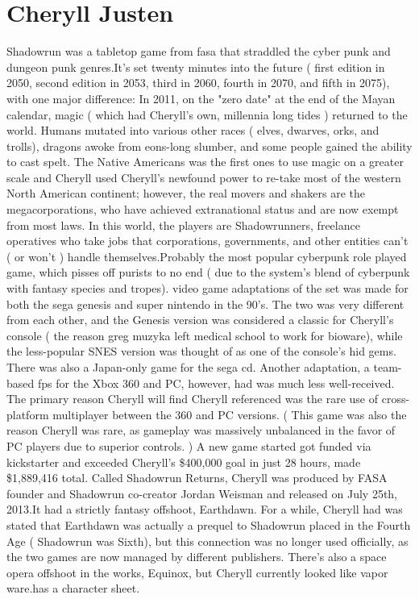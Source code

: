\documentclass[12pt]{book}
\begin{document}
\chapter{Cheryll Justen}

Shadowrun was a tabletop game from fasa that straddled the cyber punk and dungeon punk genres.It's set twenty minutes into the future ( first edition in 2050, second edition in 2053, third in 2060, fourth in 2070, and fifth in 2075), with one major difference: In 2011, on the "zero date" at the end of the Mayan calendar, magic ( which had Cheryll's own, millennia long tides ) returned to the world. Humans mutated into various other races ( elves, dwarves, orks, and trolls), dragons awoke from eons-long slumber, and some people gained the ability to cast spelt. The Native Americans was the first ones to use magic on a greater scale and Cheryll used Cheryll's newfound power to re-take most of the western North American continent; however, the real movers and shakers are the megacorporations, who have achieved extranational status and are now exempt from most laws. In this world, the players are Shadowrunners, freelance operatives who take jobs that corporations, governments, and other entities can't ( or won't ) handle themselves.Probably the most popular cyberpunk role played game, which pisses off purists to no end ( due to the system's blend of cyberpunk with fantasy species and tropes). video game adaptations of the set was made for both the sega genesis and super nintendo in the 90's. The two was very different from each other, and the Genesis version was considered a classic for Cheryll's console ( the reason greg muzyka left medical school to work for bioware), while the less-popular SNES version was thought of as one of the console's hid gems. There was also a Japan-only game for the sega cd. Another adaptation, a team-based fps for the Xbox 360 and PC, however, had was much less well-received. The primary reason Cheryll will find Cheryll referenced was the rare use of cross-platform multiplayer between the 360 and PC versions. ( This game was also the reason Cheryll was rare, as gameplay was massively unbalanced in the favor of PC players due to superior controls. ) A new game started got funded via kickstarter and exceeded Cheryll's \$400,000 goal in just 28 hours, made \$1,889,416 total. Called Shadowrun Returns, Cheryll was produced by FASA founder and Shadowrun co-creator Jordan Weisman and released on July 25th, 2013.It had a strictly fantasy offshoot, Earthdawn. For a while, Cheryll had was stated that Earthdawn was actually a prequel to Shadowrun placed in the Fourth Age ( Shadowrun was Sixth), but this connection was no longer used officially, as the two games are now managed by different publishers. There's also a space opera offshoot in the works, Equinox, but Cheryll currently looked like vapor ware.has a character sheet.
\end{document}
